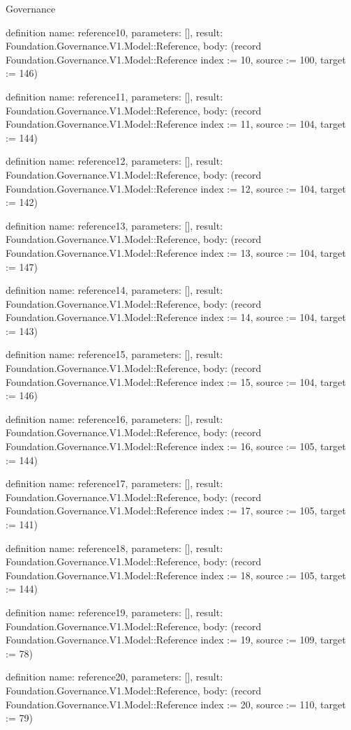 \begin{lexlean}{Governance}
\begin{semanticmodule}
definition{
  name: reference10,
  parameters: [],
  result: Foundation.Governance.V1.Model::Reference,
  body: (record Foundation.Governance.V1.Model::Reference {index := 10, source := 100, target := 146})
}

definition{
  name: reference11,
  parameters: [],
  result: Foundation.Governance.V1.Model::Reference,
  body: (record Foundation.Governance.V1.Model::Reference {index := 11, source := 104, target := 144})
}

definition{
  name: reference12,
  parameters: [],
  result: Foundation.Governance.V1.Model::Reference,
  body: (record Foundation.Governance.V1.Model::Reference {index := 12, source := 104, target := 142})
}

definition{
  name: reference13,
  parameters: [],
  result: Foundation.Governance.V1.Model::Reference,
  body: (record Foundation.Governance.V1.Model::Reference {index := 13, source := 104, target := 147})
}

definition{
  name: reference14,
  parameters: [],
  result: Foundation.Governance.V1.Model::Reference,
  body: (record Foundation.Governance.V1.Model::Reference {index := 14, source := 104, target := 143})
}

definition{
  name: reference15,
  parameters: [],
  result: Foundation.Governance.V1.Model::Reference,
  body: (record Foundation.Governance.V1.Model::Reference {index := 15, source := 104, target := 146})
}

definition{
  name: reference16,
  parameters: [],
  result: Foundation.Governance.V1.Model::Reference,
  body: (record Foundation.Governance.V1.Model::Reference {index := 16, source := 105, target := 144})
}

definition{
  name: reference17,
  parameters: [],
  result: Foundation.Governance.V1.Model::Reference,
  body: (record Foundation.Governance.V1.Model::Reference {index := 17, source := 105, target := 141})
}

definition{
  name: reference18,
  parameters: [],
  result: Foundation.Governance.V1.Model::Reference,
  body: (record Foundation.Governance.V1.Model::Reference {index := 18, source := 105, target := 144})
}

definition{
  name: reference19,
  parameters: [],
  result: Foundation.Governance.V1.Model::Reference,
  body: (record Foundation.Governance.V1.Model::Reference {index := 19, source := 109, target := 78})
}

definition{
  name: reference20,
  parameters: [],
  result: Foundation.Governance.V1.Model::Reference,
  body: (record Foundation.Governance.V1.Model::Reference {index := 20, source := 110, target := 79})
}


\end{semanticmodule}
\end{lexlean}

